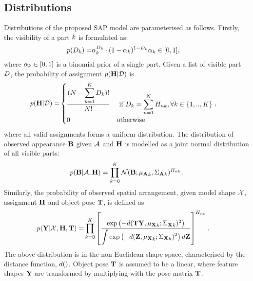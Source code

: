 \subsection{Distributions}

Distributions of the proposed SAP model are parameterised as follows. Firstly, the visibility of a part $k$ is formulated as:
\begin{align}
	p({D}_{k}) = & {\alpha}_k^{{D}_{k}}\cdot(1-{\alpha}_k)^{1-{D}_{k}} {\alpha}_k\in[0, 1], 
	\label{eqn/reg/Ddist}
\end{align}
where ${\alpha}_k\in [0, 1]$ is a binomial prior of a single part. Given a list of visible part ${D}$, the probability of assignment $p(\mathbf{H}|\mathcal{D})$ is 
\begin{align}
	p(\mathbf{H}|\mathcal{D}) = & 
	\begin{cases} 
		\displaystyle\frac{(N - \displaystyle\sum_{k=1}^{K}{D}_k)!}{N!} & \mbox{ if } {D}_k = \displaystyle\sum_{n=1}^{N}{H}_{nk},   \forall k\in\{1,..,K\} \\[3mm]
	0 & \mbox{otherwise} 
	\end{cases},
	\label{eqn/reg/HDdist}
\end{align}
where all valid assignments forms a uniform distribution. The distribution of observed appearance $\mathbf{B}$ given $\mathcal{A}$ and $\mathbf{H}$ is modelled as a joint normal distribution of all visible parts:  
\begin{equation}
	p(\mathbf{B}|\mathcal{A},\mathbf{H}) = \displaystyle\prod_{k=0}^K
	\mathcal{N}(\mathbf{B}; {\mu_{\mathbf{A}}}_k, {\Sigma_{\mathbf{A}}}_k)^{{H}_{nk}}.
	\label{eqn/reg/appearance}
\end{equation}
Similarly, the probability of observed spatial arrangement, given model shape $\mathcal{X}$, assignment $\mathbf{H}$ and object pose $\mathbf{T}$, is defined as 
\begin{align}
	\displaystyle p(\mathbf{Y}|\mathcal{X},\mathbf{H},\mathbf{T}) = & \prod_{k=0}^K
	\left[\frac{\textstyle\exp\left(-d(\mathbf{T}\mathbf{Y}, {\mu_{\mathbf{X}}}_k; {\Sigma_{\mathbf{X}}}_k)^2\right)}{\displaystyle\int \exp\left(-d(\mathbf{Z}, {\mu_{\mathbf{X}}}_k; {\Sigma_{\mathbf{X}}}_k)^2\right)d\mathbf{Z}}\right]^{{H}_{nk}}.
	\label{eqn/reg/shape}
\end{align}
The above distribution is in the non-Euclidean shape space, characterised by the distance function, $d()$. Object pose $\mathbf{T}$ is assumed to be a linear, where feature shapes $\mathbf{Y}$ are transformed by multiplying with the pose matrix $\mathbf{T}$.   

